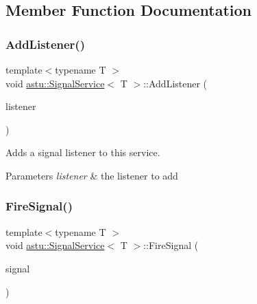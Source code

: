 \subsection{Member Function Documentation}
\mbox{\label{classastu_1_1SignalService_a9027644028616eb9bad00447648cae29}} 
\subsubsection{\texorpdfstring{Add\+Listener()}{AddListener()}}
{\footnotesize\ttfamily template$<$typename T $>$ \\
void \hyperlink{classastu_1_1SignalService}{astu\+::\+Signal\+Service}$<$ T $>$\+::Add\+Listener (\begin{DoxyParamCaption}\item[{const std\+::shared\+\_\+ptr$<$ \hyperlink{classastu_1_1ISignalListener}{I\+Signal\+Listener}$<$ T $>$$>$ \&}]{listener }\end{DoxyParamCaption})\hspace{0.3cm}{\ttfamily [inline]}}

Adds a signal listener to this service.


\begin{DoxyParams}{Parameters}
{\em listener} & the listener to add \\
\hline
\end{DoxyParams}
\mbox{\label{classastu_1_1SignalService_a3ead09955e8e76bbdd6d9e5a853e88af}} 
\subsubsection{\texorpdfstring{Fire\+Signal()}{FireSignal()}}
{\footnotesize\ttfamily template$<$typename T $>$ \\
void \hyperlink{classastu_1_1SignalService}{astu\+::\+Signal\+Service}$<$ T $>$\+::Fire\+Signal (\begin{DoxyParamCaption}\item[{const T \&}]{signal }\end{DoxyParamCaption})\hspace{0.3cm}{\ttfamily [inline]}}

